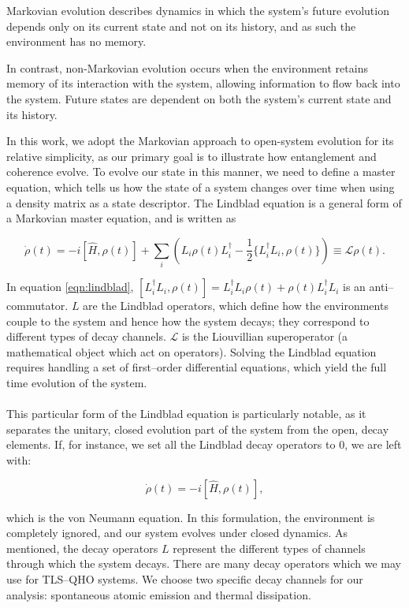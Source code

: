 \documentclass[11pt]{article}
\begin{document}
Markovian evolution describes dynamics in which the system's future evolution depends only on its current state and not on its history, and as such the environment has no memory. 

In contrast, non-Markovian evolution occurs when the environment retains memory of its interaction with the system, allowing information to flow back into the system. Future states are dependent on both the system's current state and its history. 

In this work, we adopt the Markovian approach to open-system evolution for its relative simplicity, as our primary goal is to illustrate how entanglement and coherence evolve. To evolve our state in this manner, we need to define a master equation, which tells us how the state of a system changes over time when using a density matrix as a state descriptor. The Lindblad equation is a general form of a Markovian master equation, and is written as 

\begin{equation} \label{eqn:lindblad}
    \dot \rho(t) = - i[\hat{H}, \rho(t)] + \sum_i\left(L_i\rho(t)L_i^\dagger - \frac{1}{2}\{L_i^\dagger L_i,\rho(t)\} \right) \equiv \mathcal{L}\rho(t).
\end{equation} 

In equation \ref{eqn:lindblad}, $[L_i^\dagger L_i, \rho (t)] = L_i^\dagger L_i\rho(t) + \rho(t)L_i^\dagger L_i$ is an anti--commutator. $L$ are the Lindblad operators, which define how the environments couple to the system and hence how the system decays; they correspond to different types of decay channels. $\mathcal{L}$ is the Liouvillian superoperator (a mathematical object which act on operators). Solving the Lindblad equation requires handling a set of first--order differential equations, which yield the full time evolution of the system. \\
\\
This particular form of the Lindblad equation is particularly notable, as it separates the unitary, closed evolution part of the system from the open, decay elements. If, for instance, we set all the Lindblad decay operators to 0, we are left with:

\begin{equation}
    \dot \rho(t) = - i[\hat{H}, \rho(t)],
\end{equation}

which is the von Neumann equation. In this formulation, the environment is completely ignored, and our system evolves under closed dynamics. As mentioned, the decay operators $L$ represent the different types of channels through which the system decays. There are many decay operators which we may use for TLS--QHO systems. We choose two specific decay channels for our analysis: spontaneous atomic emission and thermal dissipation. 
\end{document}
